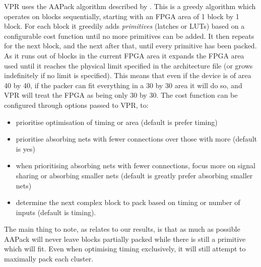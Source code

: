 \documentclass[12pt,final,oneside]{dwThesis} %
\begin{document}
   \gls{VPR} uses the AAPack algorithm described by \cite{AAPackThesis}. This
   is a greedy algorithm which operates on blocks sequentially, starting with
   an \gls{FPGA} area of 1 block by 1 block. For each block it greedily adds
   \textit{primitives} (latches or \glspl{LUT}) based on a configurable cost
   function until no more primitives can be added. It then repeats for the next
   block, and the next after that, until every primitive has been packed. As it
   runs out of blocks in the current \gls{FPGA} area it expands the \gls{FPGA}
   area used until it reaches the physical limit specified in the architecture
   file (or grows indefinitely if no limit is specified). This means that even
   if the device is of area 40 by 40, if the packer can fit everything in a 30
   by 30 area it will do so, and \gls{VPR} will treat the \gls{FPGA} as being
   only 30 by 30.  The cost function can be configured through options passed
   to \gls{VPR}, to\cite{VPRManual}: \begin{itemize}
      \item prioritise optimisation of timing or area (default is prefer
            timing)
      \item prioritise absorbing nets with fewer connections over those with
            more (default is yes)
      \item when prioritising absorbing nets with fewer connections, focus more
            on signal sharing or absorbing smaller nets (default is greatly
            prefer absorbing smaller nets)
      \item determine the next complex block to pack based on timing or number
            of inputs (default is timing).  \end{itemize} The main thing to
      note, as relates to our results, is that as much as possible AAPack will
      never leave blocks partially packed while there is still a primitive
      which will fit. Even when optimising timing exclusively, it will still
      attempt to maximally pack each cluster.
\end{document}
